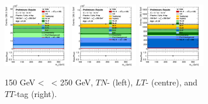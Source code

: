 \begin{figure}[h!]
    \centering
    \begin{subfigure}[b]{\textwidth}
        \centering
        \includegraphics[width=0.32\textwidth]{Images/VH/Own_fit/postfit_VHcc/Region_distmBB_BMax250_BMin150_DCRHigh_J3_TTypent_T1_L0_Y6051_GlobalFit_conditionnal_mu1.png}
        \includegraphics[width=0.32\textwidth]{Images/VH/Own_fit/postfit_VHcc/Region_distmBB_BMax250_BMin150_DCRHigh_J3_TTypelt_T2_L0_Y6051_GlobalFit_conditionnal_mu1.png}
        \includegraphics[width=0.32\textwidth]{Images/VH/Own_fit/postfit_VHcc/Region_distmBB_BMax250_BMin150_DCRHigh_J3_TTypett_T2_L0_Y6051_GlobalFit_conditionnal_mu1.png}
        \caption{150 GeV < \ptv\ < 250 GeV, $TN$- (left), $LT$- (centre), and $TT$-tag (right).}
        \label{fig:plots_VHcc_OL_150_CRH_2c_3J}
    \end{subfigure}
    \begin{subfigure}[b]{\textwidth}
        \centering


\end{subfigure}
\end{figure}

